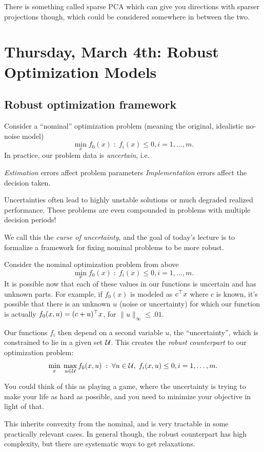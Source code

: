 \documentclass[11 pt]{scrartcl}
\begin{document}
There is something called sparse PCA which can give you directions with sparser projections though, which could be considered somewhere in between the two.

\newpage
\section{Thursday, March 4th: Robust Optimization Models}

\subsection{Robust optimization framework}
Consider a ``nominal'' optimization problem (meaning the original, idealistic no-noise model) 
\[ \min_x f_0(x) \; : \; f_i(x) \leq 0, i = 1,\dots, m.\] 
In practice, our problem data is \emph{uncertain}, i.e. 
\begin{itemize}
    \ii \emph{Estimation} errors affect problem parameters
    \ii \emph{Implementation} errors affect the decision taken.
\end{itemize}

Uncertainties often lead to highly unstable solutions or much degraded realized performance. 
These problems are even compounded in problems with multiple decision periods! 

We call this the \emph{curse of uncertainty}, and the goal of today's lecture is to formalize a framework for fixing nominal problems to be more robust.

Consider the nominal optimization problem from above
\[ \min_x f_0(x) \; :\; f_i(x) \leq 0, i=1,\dots, m.\] 
It is possible now that each of these values in our functions is uncertain and has unknown parts. 
For example, if $f_0(x)$ is modeled as $c^\top x$ where $c$ is known, it's possible that there is an unknown $u$ (noise or uncertainty) for which our function is actually $f_0(x,u) = (c+u)^\top x$, for $\|u\|_\infty \leq .01$. 

Our functions $f_i$ then depend on a second variable $u$, the ``uncertainty'', which is constrained to lie in a given set $\mathcal U$. 
This creates the \emph{robust counterpart} to our optimization problem:
\[ \min_x\; \max_{u\in \mathcal U} f_0(x,u) \; : \; \forall u\in \mathcal U,\; f_i(x,u) \leq 0, i = 1,\dots, m.\] 

You could think of this as playing a game, where the uncertainty is trying to make your life as hard as possible, and you need to minimize your objective in light of that. 

This inherits convexity from the nominal, and is very tractable in some practically relevant cases. 
In general though, the robust counterpart has high complexity, but there are systematic ways to get relaxations. 
\end{document}
